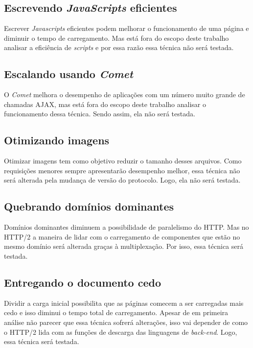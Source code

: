 \subsection{Escrevendo \textit{JavaScripts} eficientes}
\label{subsec:preliminares_tec19}
Escrever \textit{Javascripts} eficientes podem melhorar o funcionamento de uma página e diminuir o tempo de carregamento. Mas está fora do escopo deste trabalho analisar a eficiência de \textit{scripts} e por essa razão essa técnica não será testada.

\subsection{Escalando usando \textit{Comet}}
\label{subsec:preliminares_tec20}
O \textit{Comet} melhora o desempenho de aplicações com um número muito grande de chamadas AJAX, mas está fora do escopo deste trabalho analisar o funcionamento dessa técnica. Sendo assim, ela não será testada.

\subsection{Otimizando imagens}
\label{subsec:preliminares_tec21}
Otimizar imagens tem como objetivo reduzir o tamanho desses arquivos. Como requisições menores sempre apresentarão desempenho melhor, essa técnica não será alterada pela mudança de versão do protocolo. Logo, ela não será testada.

\subsection{Quebrando domínios dominantes}
\label{subsec:preliminares_tec22}
Domínios dominantes diminuem a possibilidade de paralelismo do HTTP. Mas no HTTP/2 a maneira de lidar com o carregamento de componentes que estão no mesmo domínio será alterada graças à multiplexação. Por isso, essa técnica será testada.

\subsection{Entregando o documento cedo}
\label{subsec:preliminares_tec23}
Dividir a carga inicial possibilita que as páginas comecem a ser carregadas mais cedo e isso diminui o tempo total de carregamento. Apesar de em primeira análise não parecer que essa técnica sofrerá alterações, isso vai depender de como o HTTP/2 lida com as funções de descarga das linguagens de \textit{back-end}. Logo, essa técnica será testada.

